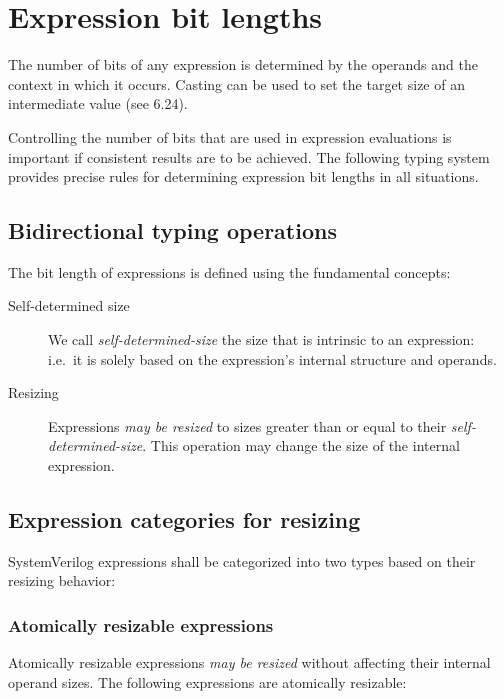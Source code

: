 \documentclass{article}
\newcommand{\sds}{\emph{self-determined-size}}
\newcommand{\mbr}{\emph{may be resized}}
\begin{document}
\section{Expression bit lengths}%
\label{expression-bit-lengths}

The number of bits of any expression is determined by the operands and the
context in which it occurs. Casting can be used to set the target size of an
intermediate value (see 6.24).

Controlling the number of bits that are used in expression evaluations is
important if consistent results are to be achieved. The following typing system
provides precise rules for determining expression bit lengths in all situations.

\subsection{Bidirectional typing operations}%
\label{bidirectional-typing-operations}

The bit length of expressions is defined using the fundamental concepts:

\begin{description}
  \item[Self-determined size]
    We call \sds{} the size that is intrinsic to an expression: i.e.~it is
    solely based on the expression's internal structure and operands.

  \item[Resizing]
    Expressions \mbr{} to sizes greater than or equal to their \sds{}. This
    operation may change the size of the internal expression.
\end{description}

\subsection{Expression categories for resizing}%
\label{expression-categories-for-resizing}

SystemVerilog expressions shall be categorized into two types based on their
resizing behavior:

\subsubsection{Atomically resizable expressions}%
\label{atomically-resizable-expressions}

Atomically resizable expressions \mbr{} without affecting their
internal operand sizes. The following expressions are atomically resizable:
\end{document}
